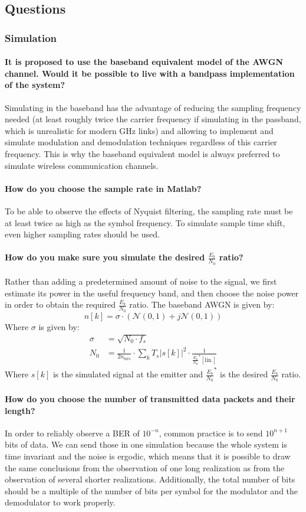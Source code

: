 \subsection{Questions}
\subsubsection{Simulation}
\paragraph{It is proposed to use the baseband equivalent model of the AWGN channel. Would it be
possible to live with a bandpass implementation of the system?}
Simulating in the baseband has the advantage of reducing the sampling frequency needed (at least roughly twice the carrier frequency if simulating in the passband, which is unrealistic for modern \si{\giga\hertz} links) and allowing to implement and simulate modulation and demodulation techniques regardless of this carrier frequency.
This is why the baseband equivalent model is always preferred to simulate wireless communication channels.
\paragraph{How do you choose the sample rate in Matlab?}
To be able to observe the effects of Nyquist filtering, the sampling rate must be at least twice as high as the symbol frequency. To simulate sample time shift, even higher sampling rates should be used.
\paragraph{How do you make sure you simulate the desired $\frac{E_b}{N_0}$ ratio?}
Rather than adding a predetermined amount of noise to the signal, we first estimate its power in the useful frequency band, and then choose the noise power in order to obtain the required $\frac{E_b}{N_0}$ ratio.
The baseband AWGN is given by:
\[
n[k] = \sigma \cdot \left ( \mathcal{N}(0,1) + j \mathcal{N}(0,1) \right )
\]
Where $\sigma$ is given by:
\begin{align*}
\sigma &= \sqrt{N_0\cdot f_s}\\
N_0 &= \frac{1}{2n_{bits}}\cdot \sum_k{T_s{\big | s[k]\big |}^2} \cdot \frac{1}{\tfrac{E_b}{N_0}^*[\mathrm{lin.}]}
\end{align*}
Where $s[k]$ is the simulated signal at the emitter and $\frac{E_b}{N_0}^*$ is the desired $\frac{E_b}{N_0}$ ratio.
\paragraph{How do you choose the number of transmitted data packets and their length?}
In order to reliably observe a BER of $10^{-n}$, common practice is to send $10^{n+1}$ bits of data. We can send those in one simulation because the whole system is time invariant and the noise is ergodic, which means that it is possible to draw the same conclusions from the observation of one long realization as from the observation of several shorter realizations.
Additionally, the total number of bits should be a multiple of the number of bits per symbol for the modulator and the demodulator to work properly.

